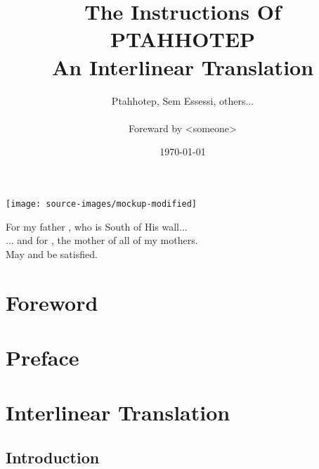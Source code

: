 \documentclass[a4paper,pagesize,8pt,pointlessnumbers,normalheadings]{book}
\title{
	\Large The Instructions Of\\
	\Huge \textbf{PTAHHOTEP}\\
	\vspace{2mm}
	\normalsize An Interlinear Translation}
\author{Ptahhotep, Sem Essessi, others...\\\\Foreward by <someone>}
\date{\today}
\begin{document}
\maketitle

\clearpage
\vspace*{\fill}
\clearpage

\vspace*{\fill}
\begin{center}
\texttt{[image: source-images/mockup-modified]}
\end{center}
\vspace*{\fill}
\pagebreak

\clearpage
\vspace*{\fill}
\clearpage

\vspace*{\fill}
\begin{center}
For my father , who is South of His wall...\\
\vspace{7.5mm}
... and for , the mother of all of my mothers.\\
\vspace{15mm}
May  and  be satisfied.\\
\end{center}
\vspace*{\fill}

\tableofcontents

\markboth{}{}

\newlength\q
\setlength{}

\chapter*{Foreword}

\markboth{}{}

\chapter*{Preface}

\markboth{}{}

\chapter*{Interlinear Translation}
{}
\section*{Introduction}


\pagebreak

\printindex
\end{document}
